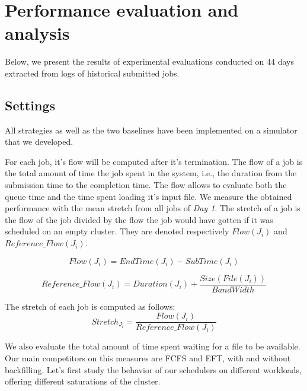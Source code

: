 \documentclass[conference,10pt]{IEEEtran}
\newcommand{\file}{\ensuremath{\mathit{File}}\xspace}
\newcommand{\size}{\ensuremath{\mathit{Size}}\xspace}
\newcommand{\duration}{\mathit{Duration}\xspace}
\newcommand{\bandwidth}{\mathit{BandWidth}\xspace}
\newcommand{\submissiontime}{\mathit{SubTime}\xspace}
\newcommand{\emptyflow}{\mathit{Reference\_Flow}\xspace}
\newcommand{\Endtime}{\mathit{EndTime}\xspace}
\begin{document}
\section{Performance evaluation and analysis}\label{sec.evaluations}

Below, we present the results of experimental evaluations conducted 
on 44 days extracted from logs of historical submitted jobs.

\subsection{Settings}

All strategies as well as the two baselines have been implemented on
a simulator that we developed.

For each job, it's flow will be computed after it's termination.
The flow of a job is the total amount of time the job spent in the system, i.e.,
the duration from the submission time to the completion time. The flow
allows to evaluate both the queue time and the time spent loading it's input file.
We measure the obtained performance with the mean
stretch from all jobs of \textit{Day 1}.
The stretch of a job is the flow of the job divided
by the flow the job would have gotten if it was scheduled on an empty cluster.
They are denoted respectively $Flow(J_i)$ and $\emptyflow(J_i)$.

\begin{equation}
Flow(J_i) = \Endtime(J_i) - \submissiontime(J_i)
\end{equation}

\begin{equation}
\emptyflow(J_i) = \duration(J_i) + \frac{\size(\file(J_i))}{\bandwidth}
\end{equation}

The stretch of each job is computed as follows:
\begin{equation}
Stretch_{J_i} = \frac{Flow(J_i)}{\emptyflow(J_i)}
\end{equation}

We also evaluate the total amount of time spent waiting for a file to be available.
Our main competitors on this measures are FCFS and EFT, with and without backfilling.
Let's first study the behavior of our schedulers on different workloads,
offering different saturations of the cluster.
\end{document}

